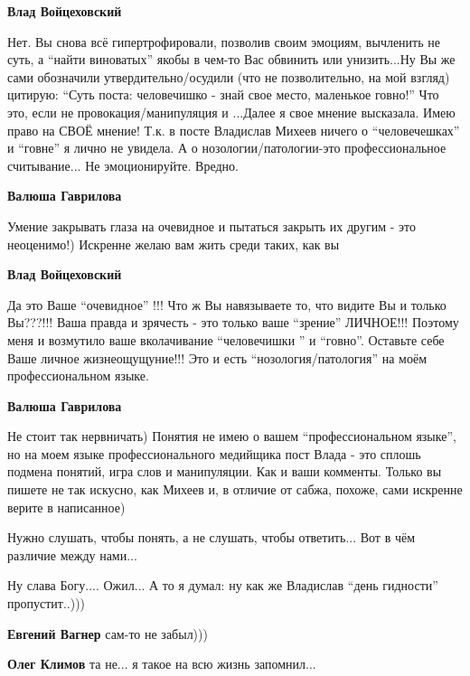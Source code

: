 \begin{itemize}
\begin{itemize}
\textbf{Влад Войцеховский} 

Нет. Вы снова всё гипертрофировали, позволив своим эмоциям, вычленить не суть,
а \enquote{найти виноватых} якобы в чем-то Вас обвинить или унизить...Ну Вы же сами
обозначили утвердительно/осудили (что не позволительно, на мой взгляд) цитирую:
\enquote{Суть поста: человечишко - знай свое место, маленькое говно!} Что это, если не
провокация/манипуляция и ...Далее я свое мнение высказала. Имею право на СВОЁ
мнение! Т.к. в посте Владислав Михеев ничего о \enquote{человечешках} и \enquote{говне} я
лично не увидела. А о нозологии/патологии-это профессиональное считывание... Не
эмоционируйте. Вредно.

\textbf{Валюша Гаврилова} 

Умение закрывать глаза на очевидное и пытаться закрыть их другим - это
неоценимо!) Искренне желаю вам жить среди таких, как вы

\textbf{Влад Войцеховский} 

Да это Ваше \enquote{очевидное} !!! Что ж Вы навязываете то, что видите Вы и только
Вы???!!! Ваша правда и зрячесть - это только ваше \enquote{зрение} ЛИЧНОЕ!!! Поэтому
меня и возмутило ваше вколачивание \enquote{человечишки } и \enquote{говно}. Оставьте себе
Ваше личное жизнеощущуние!!! Это и есть \enquote{нозология/патология} на моём
профессиональном языке.

\textbf{Валюша Гаврилова} 

Не стоит так нервничать) Понятия не имею о вашем \enquote{профессиональном языке}, но
на моем языке профессионального медийщика пост Влада - это сплошь подмена
понятий, игра слов и манипуляции. Как и ваши комменты. Только вы пишете не так
искусно, как Михеев и, в отличие от сабжа, похоже, сами искренне верите в
написанное)

Нужно слушать, чтобы понять, а не слушать, чтобы ответить... Вот в чём различие между нами...
\end{itemize} %

Ну слава Богу.... Ожил...
А то я думал: ну как же Владислав \enquote{день гидности} пропустит..)))

\begin{itemize} %
\textbf{Евгений Вагнер} сам-то не забыл)))

\textbf{Олег Климов} та не... я такое на всю жизнь запомнил...


\end{itemize}
\end{itemize}
